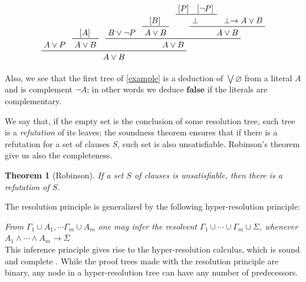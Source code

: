 \documentclass[a4paper,12pt,oneside]{book}
\newtheorem{theorem}{Theorem}[chapter]
\let\emptyset\varnothing
\let\o\vee
\let\e\wedge
\let\bottom\perp
\begin{document}
\begin{equation*}
\prftree{\prfassumption{A\o P}}
{\prftree{\prfboundedassumption{A} }{A\o B}}
{\prftree{\prfassumption{B\o\neg P} }{\prftree{\prfboundedassumption{B} }{A\o B}}
 { \prftree{ \prftree{\prfboundedassumption{P}}{\prfboundedassumption{\neg P}}{\bottom}}{\prfassumption{ \bottom\rightarrow A\o B }}{A\o B} } 
{ A\o B} }
{A\o B}
\end{equation*}


Also, we see that the first tree of  \ref{example} is a deduction of $\bigvee\emptyset$ from a literal $A$ and is complement $\neg A$; in other words we deduce $\mathbf{false}$ if the literals are complementary.

We say that, if the empty set is the conclusion of some resolution tree, such tree is a \textit{refutation} of its leaves; the soundness theorem ensures that if there is a refutation for a set of clauses $S$, such set is also unsatisfiable. Robinson's theorem \cite{robinson} give us also the completeness.
\begin{theorem}[Robinson]\label{originalRob}
If a set $S$ of clauses is unsatisfiable, then there is a refutation of $S$.
\end{theorem}

\noindent
The resolution principle is generalized by the following hyper-resolution principle:

\textit{From $\Gamma_1\cup A_1,\cdots\Gamma_m\cup A_m $ one may infer the resolvent $\Gamma_1\cup\cdots\cup\Gamma_m\cup \Sigma$, whenever $A_1\e\cdots\e A_m\rightarrow \overline{\Sigma}$}\\  
This inference principle gives rise to the hyper-resolution calculus, which is sound and complete \cite{rob,robinson-general}. While the proof trees made with the resolution principle are binary, any node in a hyper-resolution tree can have any number of predecessors.
\end{document}
